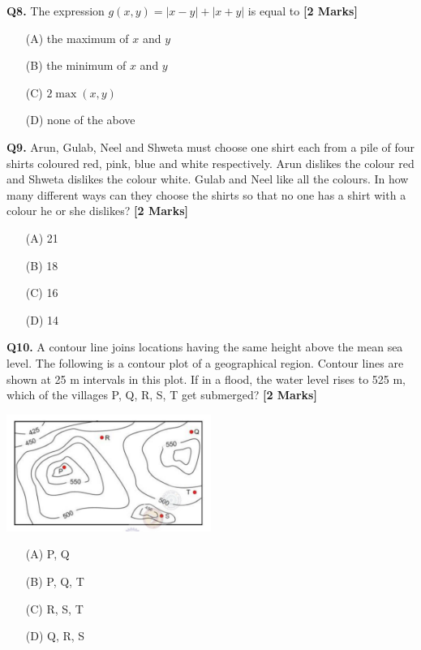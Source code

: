\documentclass[11pt]{article}
\newcommand{\questionb}[2]{
    \noindent\textbf{Q#2.} #1 \hfill \textbf{[2 Marks]}
}
\begin{document}
\questionb{The expression \( g(x, y) = |x - y| + |x + y| \) is equal to}{8}
\begin{enumerate}
    \item[(A)] the maximum of \( x \) and \( y \)  
    \item[(B)] the minimum of \( x \) and \( y \)  
    \item[(C)] \( 2 \max(x, y) \)  
    \item[(D)] none of the above  
\end{enumerate}
\vspace{0.5cm}

\questionb{Arun, Gulab, Neel and Shweta must choose one shirt each from a pile of four shirts coloured red, pink, blue and white respectively. Arun dislikes the colour red and Shweta dislikes the colour white. Gulab and Neel like all the colours. In how many different ways can they choose the shirts so that no one has a shirt with a colour he or she dislikes?}{9}
\begin{enumerate}
    \item[(A)] 21  
    \item[(B)] 18  
    \item[(C)] 16  
    \item[(D)] 14  
\end{enumerate}
\vspace{0.5cm}

\questionb{A contour line joins locations having the same height above the mean sea level. The following is a contour plot of a geographical region. Contour lines are shown at 25 m intervals in this plot. If in a flood, the water level rises to 525 m, which of the villages P, Q, R, S, T get submerged?}{10}
\begin{center}
\includegraphics[width=0.5\textwidth]{figures/10.png}
\end{center}
\begin{enumerate}
    \item[(A)] P, Q  
    \item[(B)] P, Q, T  
    \item[(C)] R, S, T  
    \item[(D)] Q, R, S  
\end{enumerate}
\vspace{0.5cm}
\end{document}
